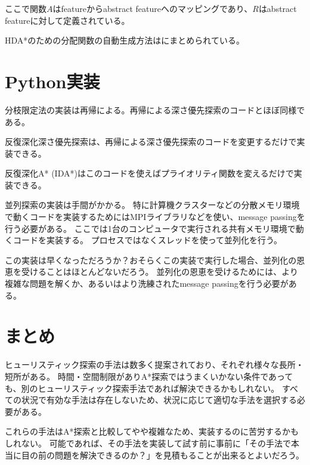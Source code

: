 ここで関数$A$はfeatureからabstract featureへのマッピングであり、$R$はabstract featureに対して定義されている。

HDA*のための分配関数の自動生成方法は\cite{jinnai2017work}にまとめられている。


\section{Python実装}

分枝限定法の実装は再帰による。再帰による深さ優先探索のコードとほぼ同様である。


反復深化深さ優先探索は、再帰による深さ優先探索のコードを変更するだけで実装できる。


反復深化A* (IDA*)はこのコードを使えばプライオリティ関数を変えるだけで実装できる。


並列探索の実装は手間がかかる。
特に計算機クラスターなどの分散メモリ環境で動くコードを実装するためにはMPIライブラリなどを使い、message passingを行う必要がある。
ここでは1台のコンピュータで実行される共有メモリ環境で動くコードを実装する。
プロセスではなくスレッドを使って並列化を行う。


この実装は早くなっただろうか？おそらくこの実装で実行した場合、並列化の恩恵を受けることはほとんどないだろう。
並列化の恩恵を受けるためには、より複雑な問題を解くか、あるいはより洗練されたmessage passingを行う必要がある。



\section{まとめ}

ヒューリスティック探索の手法は数多く提案されており、それぞれ様々な長所・短所がある。
時間・空間制限がありA*探索ではうまくいかない条件であっても、別のヒューリスティック探索手法であれば解決できるかもしれない。
すべての状況で有効な手法は存在しないため、状況に応じて適切な手法を選択する必要がある。

これらの手法はA*探索と比較してやや複雑なため、実装するのに苦労するかもしれない。
可能であれば、その手法を実装して試す前に事前に「その手法で本当に目の前の問題を解決できるのか？」を見積もることが出来るとよいだろう。


